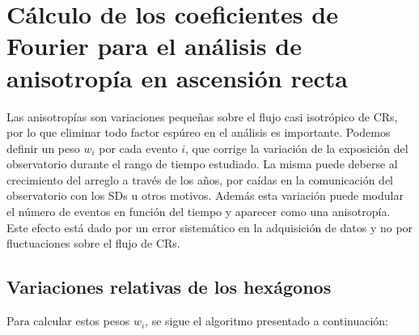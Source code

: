 
\section{Cálculo de los coeficientes de Fourier para el análisis de anisotropía en ascensión recta}

Las anisotropías son variaciones pequeñas sobre el flujo casi isotrópico de CRs, por lo que eliminar todo factor espúreo en el análisis es importante.  Podemos definir un peso  $w_i$ por cada evento $i$, que corrige la variación de la exposición del observatorio durante el rango de tiempo estudiado. La misma puede deberse al crecimiento del arreglo a través de los años,  por caídas en la comunicación del observatorio con los SDs u otros motivos. Además esta variación puede modular el número de  eventos en función del tiempo y aparecer como una anisotropía. Este efecto está dado por un error sistemático en la adquisición de datos y no por fluctuaciones sobre el flujo de CRs.

  \subsection{Variaciones relativas de los hexágonos} \label{peso_hexagonos}


    Para calcular estos pesos $w_i$, se sigue el algoritmo presentado a continuación:
     
